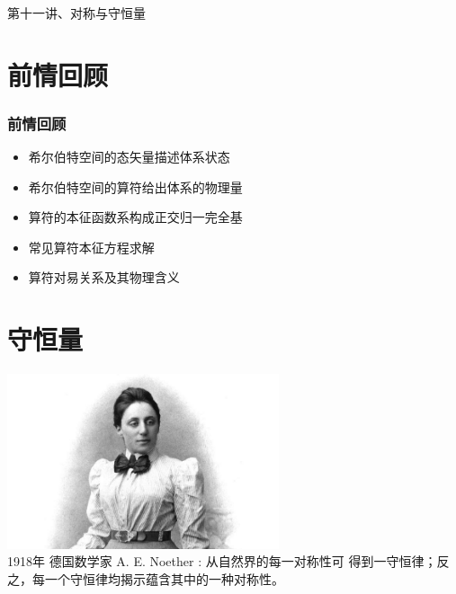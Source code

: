 \begin{frame}
    \frametitle{}
    \begin{center}
    { {\huge 第十一讲、对称与守恒量}}
    \end{center}    
\end{frame}


\section{前情回顾}

\begin{frame}
    \frametitle{前情回顾}
    \begin{itemize}
        \item 希尔伯特空间的态矢量描述体系状态
        \item 希尔伯特空间的算符给出体系的物理量
        \item 算符的本征函数系构成正交归一完全基
        \item 常见算符本征方程求解
        \item 算符对易关系及其物理含义 
    \end{itemize}   
\end{frame} 

\section{守恒量}

\begin{frame}
\includegraphics[width=0.6\textwidth]{figs/2021-12-17-21-25-13.png} \\
1918年 德国数学家 A. E. Noether : 从自然界的每一对称性可
得到一守恒律；反之，每一个守恒律均揭示蕴含其中的一种对称性。
\end{frame} 

